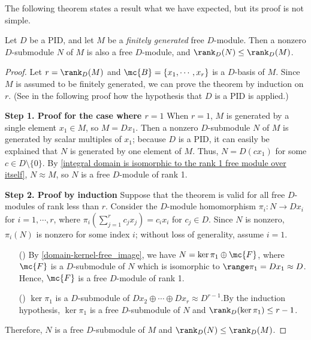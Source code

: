The following theorem states a result what we have expected, but its proof is not simple.
\begin{thm}\label{submodules of a finite-rank free module over a pid are free}
    Let $D$ be a PID, and let $M$ be a \textit{finitely generated} free $D$-module.
    Then a nonzero $D$-submodule $N$ of $M$ is also a free $D$-module, and $\rank_D(N)\leq\rank_D(M)$.
\end{thm}
\begin{proof}
    Let $r=\rank_D(M)$ and $\mc{B}=\{x_1, \cdots, x_r\}$ is a $D$-basis of $M$.
    Since $M$ is assumed to be finitely generated, we can prove the theorem by induction on $r$. (See in the following proof how the hypothesis that $D$ is a PID is applied.)

    \textbf{Step 1. Proof for the case where $r=1$}\newline\indent
    When $r=1$, $M$ is generated by a single element $x_1\in M$, so $M=Dx_1$.
    Then a nonzero $D$-submodule $N$ of $M$ is generated by scalar multiples of $x_1$; because $D$ is a PID, it can easily be explained that $N$ is generated by one element of $M$.
    Thus, $N=D(cx_1)$ for some $c\in D\setminus\{0\}$.
    By \cref{integral domain is isomorphic to the rank 1 free module over itself}, $N\approx M$, so $N$ is a free $D$-module of rank 1.

    \textbf{Step 2. Proof by induction}\newline\indent
    Suppose that the theorem is valid for all free $D$-modules of rank less than $r$.
    Consider the $D$-module homomorphism $\pi_i: N\rightarrow Dx_i$ for $i=1, \cdots, r$, where $\pi_i(\sum_{j=1}^r c_jx_j)=c_ix_i$ for $c_j\in D$.
    Since $N$ is nonzero, $\pi_i(N)$ is nonzero for some index $i$; without loss of generality, assume $i=1$.
    \begin{enumerate}
        \item[(\romannumeral 1)]
        {
            By \cref{domain-kernel-free_image}, we have $N=\ker\pi_1\oplus\mc{F}$, where $\mc{F}$ is a $D$-submodule of $N$ which is isomorphic to $\range\pi_1=Dx_1\approx D$.
            Hence, $\mc{F}$ is a free $D$-module of rank 1.
        }
        \item[(\romannumeral 2)]
        {
            $\ker\pi_1$ is a $D$-submodule of $Dx_2\oplus\cdots\oplus Dx_r\approx D^{r-1}$.By the induction hypothesis, $\ker\pi_1$ is a free $D$-submodule of $N$ and $\rank_D(\ker\pi_1)\leq r-1$.
        }
    \end{enumerate}
    Therefore, $N$ is a free $D$-submodule of $M$ and $\rank_D(N)\leq\rank_D(M)$.
\end{proof}
